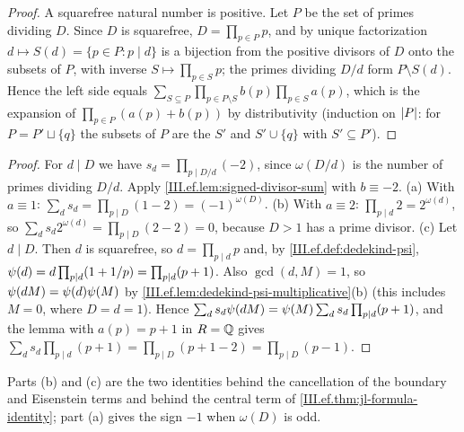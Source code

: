 \begin{lemma}
\end{lemma}
\begin{proof}
A squarefree natural number is positive. Let $P$ be the set of primes dividing $D$. Since $D$ is squarefree, $D=\prod_{p\in P}p$, and by unique
factorization $d\mapsto S(d)=\{p\in P:p\mid d\}$ is a bijection from the positive divisors of $D$ onto the subsets of $P$, with inverse
$S\mapsto\prod_{p\in S}p$; the primes dividing $D/d$ form $P\setminus S(d)$. Hence the left side equals
$\sum_{S\subseteq P}\prod_{p\in P\setminus S}b(p)\prod_{p\in S}a(p)$, which is the expansion of $\prod_{p\in P}(a(p)+b(p))$ by distributivity (induction on
$\lvert P\rvert$: for $P=P'\sqcup\{q\}$ the subsets of $P$ are the $S'$ and $S'\cup\{q\}$ with $S'\subseteq P'$).
\end{proof}

\begin{corollary}
\end{corollary}
\begin{proof}
For $d\mid D$ we have $s_d=\prod_{p\mid D/d}(-2)$, since $\omega(D/d)$ is the number of primes dividing $D/d$. Apply
\cref{III.ef.lem:signed-divisor-sum} with $b\equiv-2$.
(a) With $a\equiv1$: $\sum_ds_d=\prod_{p\mid D}(1-2)=(-1)^{\omega(D)}$.
(b) With $a\equiv2$: $\prod_{p\mid d}2=2^{\omega(d)}$, so $\sum_ds_d2^{\omega(d)}=\prod_{p\mid D}(2-2)=0$, because $D>1$ has a prime divisor.
(c) Let $d\mid D$. Then $d$ is squarefree, so $d=\prod_{p\mid d}p$ and, by \cref{III.ef.def:dedekind-psi}, $\psi(d)=d\prod_{p\mid d}(1+1/p)
=\prod_{p\mid d}(p+1)$. Also $\gcd(d,M)=1$, so $\psi(dM)=\psi(d)\psi(M)$ by \cref{III.ef.lem:dedekind-psi-multiplicative}(b) (this
includes $M=0$, where $D=d=1$). Hence $\sum_ds_d\psi(dM)=\psi(M)\sum_ds_d\prod_{p\mid d}(p+1)$, and the lemma with $a(p)=p+1$ in $R=\mathbb{Q}$
gives $\sum_ds_d\prod_{p\mid d}(p+1)=\prod_{p\mid D}(p+1-2)=\prod_{p\mid D}(p-1)$.
\end{proof}
\begin{remark}
Parts (b) and (c) are the two identities behind the cancellation of the boundary and Eisenstein terms and behind the central term of
\cref{III.ef.thm:jl-formula-identity}; part (a) gives the sign $-1$ when $\omega(D)$ is odd.
\end{remark}


